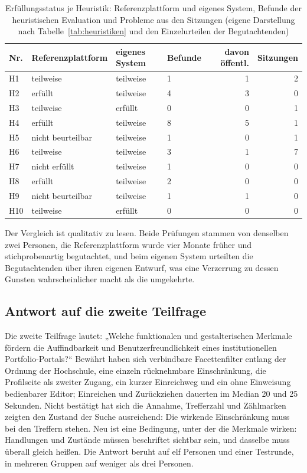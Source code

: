 \begin{table}[htbp]
	\centering
	\footnotesize
	\caption[Erfüllungsstatus je Heuristik: Referenzplattform und eigenes System]{Erfüllungsstatus je Heuristik: Referenzplattform und eigenes System, Befunde der heuristischen Evaluation und Probleme aus den Sitzungen (eigene Darstellung nach Tabelle~\ref{tab:heuristiken} und den Einzelurteilen der Begutachtenden)}
	\label{tab:heuristikvergleich}
	\begin{tabular}{@{}llllrr@{}}
		\toprule
		\textbf{Nr.} & \textbf{Referenzplattform} & \textbf{eigenes System} & \textbf{Befunde} & \textbf{davon öffentl.} & \textbf{Sitzungen} \\
		\midrule
		H1 & teilweise & teilweise & 1 & 1 & 2 \\
		H2 & erfüllt & teilweise & 4 & 3 & 0 \\
		H3 & teilweise & erfüllt & 0 & 0 & 1 \\
		H4 & erfüllt & teilweise & 8 & 5 & 1 \\
		H5 & nicht beurteilbar & teilweise & 1 & 0 & 1 \\
		H6 & teilweise & teilweise & 3 & 1 & 7 \\
		H7 & nicht erfüllt & teilweise & 1 & 0 & 0 \\
		H8 & erfüllt & teilweise & 2 & 0 & 0 \\
		H9 & nicht beurteilbar & teilweise & 1 & 1 & 0 \\
		H10 & teilweise & erfüllt & 0 & 0 & 0 \\
		\bottomrule
	\end{tabular}
\end{table}

Der Vergleich ist qualitativ zu lesen. Beide Prüfungen stammen von denselben zwei Personen, die Referenzplattform wurde vier Monate früher und stichprobenartig begutachtet, und beim eigenen System urteilten die Begutachtenden über ihren eigenen Entwurf, was eine Verzerrung zu dessen Gunsten wahrscheinlicher macht als die umgekehrte.

\subsection{Antwort auf die zweite Teilfrage}
\label{subsec:antwort-tf2}

Die zweite Teilfrage lautet: „Welche funktionalen und gestalterischen Merkmale fördern die Auffindbarkeit und Benutzerfreundlichkeit eines institutionellen Portfolio-Portals?“ Bewährt haben sich verbindbare Facettenfilter entlang der Ordnung der Hochschule, eine einzeln rücknehmbare Einschränkung, die Profilseite als zweiter Zugang, ein kurzer Einreichweg und ein ohne Einweisung bedienbarer Editor; Einreichen und Zurückziehen dauerten im Median 20 und 25 Sekunden. Nicht bestätigt hat sich die Annahme, Trefferzahl und Zählmarken zeigten den Zustand der Suche ausreichend: Die wirkende Einschränkung muss bei den Treffern stehen. Neu ist eine Bedingung, unter der die Merkmale wirken: Handlungen und Zustände müssen beschriftet sichtbar sein, und dasselbe muss überall gleich heißen. Die Antwort beruht auf elf Personen und einer Testrunde, in mehreren Gruppen auf weniger als drei Personen.

